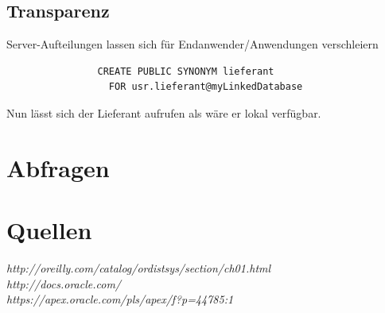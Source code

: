 \documentclass[12pt,a4paper]{article}
\begin{document}
         \subsection{Transparenz}
            Server-Aufteilungen lassen sich für Endanwender/Anwendungen verschleiern
            \begin{verbatim}
                CREATE PUBLIC SYNONYM lieferant
                  FOR usr.lieferant@myLinkedDatabase
            \end{verbatim}
            Nun lässt sich der Lieferant aufrufen als wäre er lokal verfügbar.

\section{Abfragen}
	\section{Quellen}
	\emph{http://oreilly.com/catalog/ordistsys/section/ch01.html}\\
	\emph{http://docs.oracle.com/}\\
	\emph{https://apex.oracle.com/pls/apex/f?p=44785:1}
	
\end{document}
